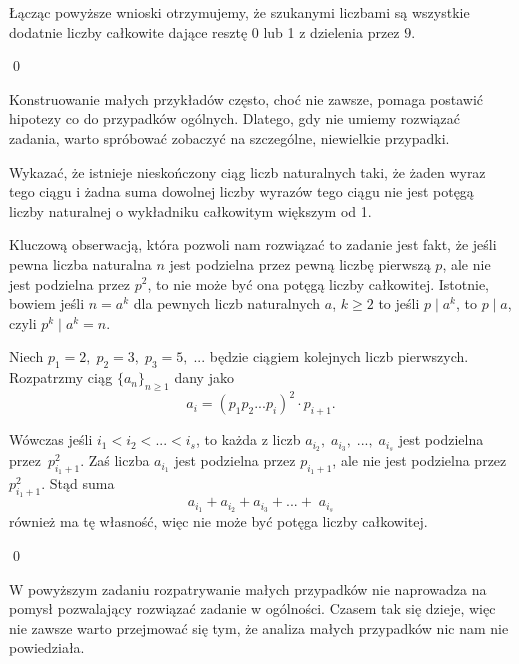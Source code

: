 \noindent
Łącząc powyższe wnioski otrzymujemy, że szukanymi liczbami są wszystkie dodatnie liczby całkowite dające resztę 0 lub 1 z dzielenia przez $9$.

\qed

\vspace{5px}

\noindent
Konstruowanie małych przykładów często, choć nie zawsze, pomaga postawić hipotezy co do przypadków ogólnych. Dlatego, gdy nie umiemy rozwiązać zadania, warto spróbować zobaczyć na szczególne, niewielkie przypadki.

\vspace{10px}


\noindent
Wykazać, że istnieje nieskończony ciąg liczb naturalnych taki, że żaden wyraz tego ciągu i żadna suma dowolnej liczby wyrazów tego ciągu nie jest potęgą liczby naturalnej o wykładniku całkowitym większym
od 1.

\vspace{5px}


\noindent
Kluczową obserwacją, która pozwoli nam rozwiązać to zadanie jest fakt, że jeśli pewna liczba naturalna $n$ jest podzielna przez pewną liczbę pierwszą $p$, ale nie jest podzielna przez $p^2$, to nie może być ona potęgą liczby całkowitej. Istotnie, bowiem jeśli $n = a^k$ dla pewnych liczb naturalnych $a$, $k \geqslant 2$ to jeśli $p \mid a^k$, to $p \mid a$, czyli $p^k \mid a^k = n$.

\vspace{5px}

\noindent
Niech $p_1 = 2,\; p_2 = 3, \; p_3 = 5, \; ...$ będzie ciągiem kolejnych liczb pierwszych.
Rozpatrzmy ciąg $\{a_n\}_{n \geqslant 1}$ dany jako
\[
    a_i = (p_1p_2...p_i)^2\cdot p_{i + 1}. 
\]

\noindent
Wówczas jeśli $i_1 < i_2 < ... < i_s$, to każda z liczb $a_{i_2}, \; a_{i_3}, \;..., \; a_{i_s}$ jest podzielna przez~$p_{i_1 + 1}^2$. Zaś liczba $a_{i_1}$ jest podzielna przez $p_{i_1 + 1}$, ale nie jest podzielna przez $p_{i_1 + 1}^2$. Stąd suma
\[
     a_{i_1} + a_{i_2} +  a_{i_3} +  ... + \; a_{i_s}
\]
również ma tę własność, więc nie może być potęga liczby całkowitej.

\qed

\vspace{10px}
\noindent
W powyższym zadaniu rozpatrywanie małych przypadków nie naprowadza na pomysł pozwalający rozwiązać zadanie w ogólności. Czasem tak się dzieje, więc nie zawsze warto przejmować się tym, że analiza małych przypadków nic nam nie powiedziała.


\vspace{10px}